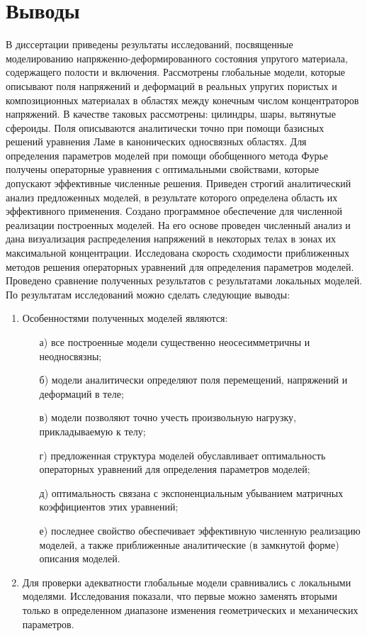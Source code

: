 
\setcounter{secnumdepth}{-1}
\chapter{Выводы}
\setcounter{secnumdepth}{2}

В диссертации приведены результаты исследований, посвященные моделированию на\-пря\-же\-н\-но-де\-фор\-ми\-ро\-ва\-н\-но\-го состояния упругого материала, содержащего полости и включения. Рассмотрены глобальные модели, которые описывают поля напряжений и деформаций в реальных упругих пористых и композиционных материалах в областях между конечным числом  концентраторов напряжений. В качестве таковых рассмотрены: цилиндры, шары, вытянутые сфероиды. Поля описываются аналитически точно при помощи базисных решений уравнения Ламе в канонических односвязных областях. Для определения параметров моделей при помощи обобщенного метода Фурье получены операторные уравнения с оптимальными свойствами, которые допускают эффективные численные решения. Приведен строгий аналитический анализ предложенных моделей, в результате которого определена область их эффективного применения. Создано программное обеспечение для численной реализации построенных моделей. На его основе проведен численный анализ и дана визуализация распределения напряжений в некоторых телах в зонах их максимальной концентрации. Исследована скорость сходимости приближенных методов решения операторных уравнений для определения параметров моделей. Проведено сравнение полученных результатов с результатами локальных моделей. По результатам исследований можно сделать следующие выводы:


\begin{enumerate}
\item Особенностями полученных моделей являются:
\begin{itemize}
\item[а)] 	все построенные модели существенно неосесимметричны и неодносвязны;
\item[б)] модели аналитически определяют поля перемещений, напряжений и деформаций в теле;
\item[в)] модели позволяют точно учесть произвольную нагрузку, прикладываемую к телу;
\item[г)] предложенная структура моделей обуславливает оптимальность операторных уравнений для определения параметров моделей;
\item[д)] оптимальность связана с экспоненциальным убыванием матричных коэффициентов этих уравнений;
\item[е)] последнее свойство обеспечивает эффективную численную реализацию моделей, а также приближенные аналитические (в замкнутой форме) описания моделей.
\end{itemize}
\item Для проверки адекватности глобальные модели сравнивались с локальными моделями. Исследования показали, что первые можно заменять вторыми только в определенном диапазоне изменения геометрических и механических параметров.
\end{enumerate}